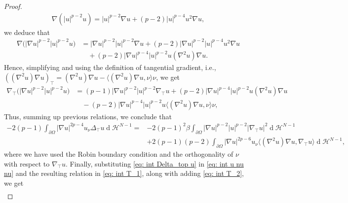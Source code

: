 \documentclass[10pt,a4paper, reqno]{amsart}
\numberwithin{equation}{section}
\renewcommand{\d}[1]{\ensuremath{\operatorname{d}\!{#1}}}
\begin{document}
\begin{proof}
\begin{equation*}
\begin{split}
        \nabla (|u|^{p-2} u) = |u|^{p-2} \nabla u + (p-2) |u|^{p-4} u^2 \nabla u,
    \end{split}
    \end{equation*}
    we deduce that
    \begin{equation*}
    \begin{split}
        \nabla \Big(|\nabla u|^{p-2} |u|^{p-2} u \Big) &= |\nabla u|^{p-2} |u|^{p-2} \nabla u + (p-2) |\nabla u|^{p-2} |u|^{p-4} u^2 \nabla u 
        \\
        &\quad+ (p-2) |\nabla u|^{p-4} |u|^{p-2} u (\nabla^2 u) \nabla u.
    \end{split}
    \end{equation*}
    Hence, simplifying and using the definition of tangential gradient, i.e., $((\nabla^2 u) \nabla u)_\top = (\nabla^2 u) \nabla u - \langle(\nabla^2 u) \nabla u,\nu\rangle \nu$, we get 
    \begin{equation*}
    \begin{split}
        \nabla_\top \Big(|\nabla u|^{p-2} |u|^{p-2} u \Big) &= (p-1) |\nabla u|^{p-2} |u|^{p-2} \nabla_\top u 
         + (p-2) |\nabla u|^{p-4} |u|^{p-2} u (\nabla^2 u) \nabla u 
         \\
        &\quad
         - (p-2) |\nabla u|^{p-4} |u|^{p-2} u \langle(\nabla^2 u) \nabla u,\nu\rangle \nu,
    \end{split}
    \end{equation*}
    Thus, summing up previous relations, we conclude that 
    \begin{equation}\label{eq: int Delta_top u}
        \begin{aligned}
        -2(p-1) \int_{\partial\Omega}|\nabla u|^{2p-4} u_\nu \Delta_\top u \d{}\mathcal{H}^{N-1} =
        &-2(p-1)^2\beta\int_{\partial\Omega}|\nabla u|^{p-2}|u|^{p-2}|\nabla_\top u|^2\d{}\mathcal{H}^{N-1}\\
        &+2(p-1)(p-2)\int_{\partial\Omega}|\nabla u|^{2p-6} u_\nu \langle(\nabla^2u)\nabla u,\nabla_\top u\rangle\d{}\mathcal{H}^{N-1},
        \end{aligned}
    \end{equation}
    where we have used the Robin boundary condition and the orthogonality of $\nu$ with respect to $\nabla_\top u$.
    Finally, substituting \eqref{eq: int Delta_top u} in \eqref{eq: int u nu nu} and the resulting relation in \eqref{eq: int T_1}, along with adding \eqref{eq: int T_2}, we get
    \begin{equation*}
        \begin{aligned}

\end{aligned}
\end{equation*}
\end{proof}
\end{document}
